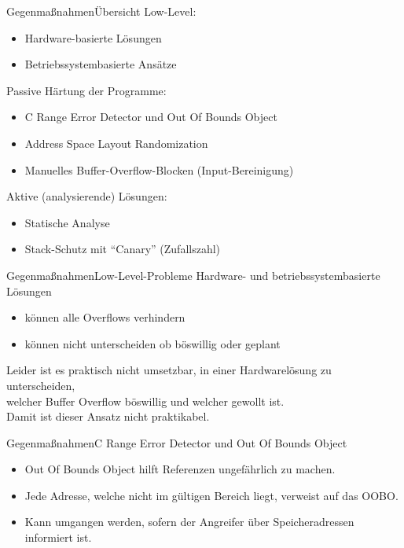 \pagebreak
\begin{frame}{Gegenmaßnahmen}{Übersicht}
    Low-Level:
\begin{itemize}
    \item Hardware-basierte Lösungen
    \item Betriebssystembasierte Ansätze
\end{itemize}
Passive Härtung der Programme:
\begin{itemize}
    \item C Range Error Detector und Out Of Bounds Object
    \item Address Space Layout Randomization
    \item Manuelles Buffer-Overflow-Blocken (Input-Bereinigung)
\end{itemize}
Aktive (analysierende) Lösungen:
\begin{itemize}
    \item Statische Analyse
    \item Stack-Schutz mit ``Canary'' (Zufallszahl)
\end{itemize}
\end{frame}



\begin{frame}{Gegenmaßnahmen}{Low-Level-Probleme}
    Hardware- und betriebssystembasierte Lösungen
   \begin{itemize}
       \item können alle Overflows verhindern
       \item können nicht unterscheiden ob böswillig oder geplant
   \end{itemize}
    
    Leider ist es praktisch nicht umsetzbar, in einer Hardwarelösung
    zu unterscheiden, \\
    welcher Buffer Overflow böswillig und welcher gewollt ist. \\
    Damit ist dieser Ansatz nicht praktikabel.
\end{frame}

\begin{frame}{Gegenmaßnahmen}{C Range Error Detector und Out Of Bounds Object}
    \begin{itemize}
        \item Out Of Bounds Object hilft Referenzen ungefährlich zu machen.
        \item Jede Adresse, welche nicht im gültigen Bereich liegt, verweist auf das OOBO. 
        \item Kann umgangen werden, sofern der Angreifer über Speicheradressen informiert ist. %
    \end{itemize}
\end{frame}




